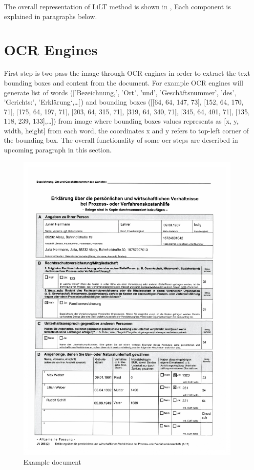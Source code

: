 The overall representation of LiLT method is shown in , Each component is explained in paragraphs below. 

\section{OCR Engines}
First step is two pass the image through OCR engines in order to extract the text bounding boxes and content from the document. For example OCR engines will generate list of words (['Bezeichnung,', 'Ort', 'und', 'Geschäftsnummer', 'des', 'Gerichts:', 'Erklärung‘,…]) and bounding boxes ([[64, 64, 147, 73], [152, 64, 170, 71], [175, 64, 197, 71], [203, 64, 315, 71], [319, 64, 340, 71], [345, 64, 401, 71], [135, 118, 239, 133],…]) from image where bounding boxes values represents as [x, y, width, height] from each word, the coordinates x and y refers to top-left corner of the bounding box. The overall functionality of some \acrshort{ocr} steps are described in upcoming paragraph in this section. 

\begin{figure}[ht]
    \centering
    \includegraphics[width=1\textwidth, trim={0 20cm 0 0},clip]{chapters/images/de_train_0.jpg}
    \caption{Example document}
    \label{fig:exampleimage}
\end{figure}



